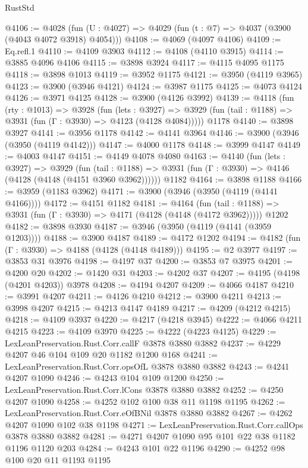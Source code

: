 \begin{lexlean}{RustStd}
\begin{coremodule}
@4106 := @4028 (fun (U : @4027) => @4029 (fun (t : @7) => @4037 (@3900 (@4043 @4072 @3918) @4054)))
@4108 := @4069 (@4097 @4106)
@4109 := Eq.refl.{1}
@4110 := @4109 @3903
@4112 := @4108 (@4110 @3915)
@4114 := @3885 @4096 @4106
@4115 := @3898 @3924
@4117 := @4115 @4095 @1175
@4118 := @3898 @1013
@4119 := @3952 @1175
@4121 := @3950 (@4119 @3965)
@4123 := @3900 (@3946 @4121)
@4124 := @3987 @1175
@4125 := @4073 @4124
@4126 := @3971 @4125
@4128 := @3900 (@4126 @3992)
@4139 := @4118
    (fun (rty : @1013) =>
    @3928
      (fun (lets : @3927) =>
      @3929 (fun (tail : @1188) => @3931 (fun (Γ : @3930) => @4123 (@4128 @4084)))))
    @1178
@4140 := @3898 @3927
@4141 := @3956 @1178
@4142 := @4141 @3964
@4146 := @3900 (@3946 (@3950 (@4119 @4142)))
@4147 := @4000 @1178
@4148 := @3999 @4147
@4149 := @4003 @4147
@4151 := @4149 @4078 @4080
@4163 := @4140
    (fun (lets : @3927) =>
    @3929
      (fun (tail : @1188) => @3931 (fun (Γ : @3930) => @4146 (@4128 (@4148 (@4151 @3960 @3962))))))
    @1182
@4164 := @3898 @1188
@4166 := @3959 (@1183 @3962)
@4171 := @3900 (@3946 (@3950 (@4119 (@4141 @4166))))
@4172 := @4151 @1182
@4181 := @4164
    (fun (tail : @1188) => @3931 (fun (Γ : @3930) => @4171 (@4128 (@4148 (@4172 @3962)))))
    @1202
@4182 := @3898 @3930
@4187 := @3946 (@3950 (@4119 (@4141 (@3959 @1203))))
@4188 := @3900 @4187
@4189 := @4172 @1202
@4194 := @4182 (fun (Γ : @3930) => @4188 (@4128 (@4148 @4189)))
@4195 := @2 @3977
@4197 := @3853 @31 @3976
@4198 := @4197 @37
@4200 := @3853 @7 @3975
@4201 := @4200 @20
@4202 := @1420 @31
@4203 := @4202 @37
@4207 := @4195 (@4198 (@4201 @4203)) @3978
@4208 := @4194 @4207
@4209 := @4066 @4187
@4210 := @3991 @4207
@4211 := @4126 @4210
@4212 := @3900 @4211
@4213 := @3998 @4207
@4215 := @4213 @4147 @4189
@4217 := @4209 (@4212 @4215)
@4218 := @4109 @3937
@4220 := @4217 (@4218 @3945)
@4222 := @4066 @4211 @4215
@4223 := @4109 @3970
@4225 := @4222 (@4223 @4125)
@4229 := LexLeanPreservation.Rust.Corr.callF @3878 @3880 @3882
@4237 := @4229 @4207 @46 @104 @109 @20 @1182 @1200 @168
@4241 := LexLeanPreservation.Rust.Corr.opsOfL @3878 @3880 @3882
@4243 := @4241 @4207 @1090
@4246 := @4243 @104 @109 @1200
@4250 := LexLeanPreservation.Rust.Corr.lCons @3878 @3880 @3882
@4252 := @4250 @4207 @1090
@4258 := @4252 @102 @100 @38 @11 @1198 @1195
@4262 := LexLeanPreservation.Rust.Corr.eOfBNil @3878 @3880 @3882
@4267 := @4262 @4207 @1090 @102 @38 @1198
@4271 := LexLeanPreservation.Rust.Corr.callOps @3878 @3880 @3882
@4281 := @4271 @4207 @1090 @95 @101 @22 @38 @1182 @1196 @1120 @203
@4284 := @4243 @101 @22 @1196
@4290 := @4252 @98 @100 @20 @11 @1193 @1195

\end{coremodule}
\end{lexlean}
